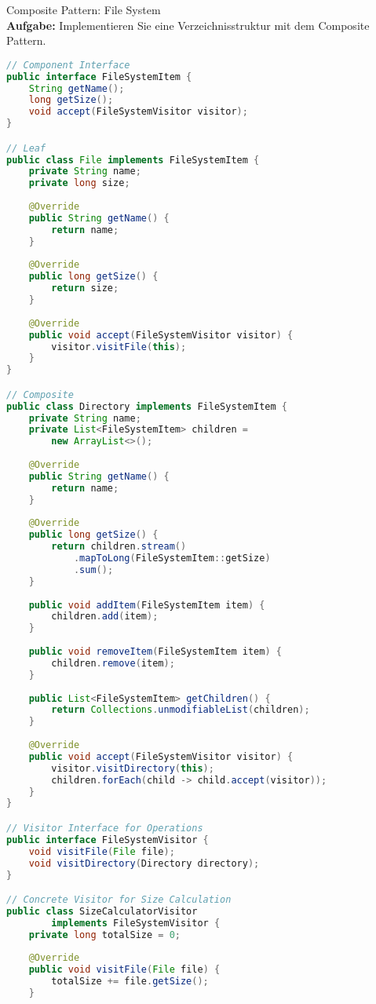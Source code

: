 \begin{example2}{Composite Pattern: File System}\\
\textbf{Aufgabe:} Implementieren Sie eine Verzeichnisstruktur mit dem Composite Pattern.

\begin{lstlisting}[language=Java, style=basesmol]
// Component Interface
public interface FileSystemItem {
    String getName();
    long getSize();
    void accept(FileSystemVisitor visitor);
}

// Leaf
public class File implements FileSystemItem {
    private String name;
    private long size;
    
    @Override
    public String getName() {
        return name;
    }
    
    @Override
    public long getSize() {
        return size;
    }
    
    @Override
    public void accept(FileSystemVisitor visitor) {
        visitor.visitFile(this);
    }
}

// Composite
public class Directory implements FileSystemItem {
    private String name;
    private List<FileSystemItem> children = 
        new ArrayList<>();
        
    @Override
    public String getName() {
        return name;
    }
    
    @Override
    public long getSize() {
        return children.stream()
            .mapToLong(FileSystemItem::getSize)
            .sum();
    }
    
    public void addItem(FileSystemItem item) {
        children.add(item);
    }
    
    public void removeItem(FileSystemItem item) {
        children.remove(item);
    }
    
    public List<FileSystemItem> getChildren() {
        return Collections.unmodifiableList(children);
    }
    
    @Override
    public void accept(FileSystemVisitor visitor) {
        visitor.visitDirectory(this);
        children.forEach(child -> child.accept(visitor));
    }
}

// Visitor Interface for Operations
public interface FileSystemVisitor {
    void visitFile(File file);
    void visitDirectory(Directory directory);
}

// Concrete Visitor for Size Calculation
public class SizeCalculatorVisitor 
        implements FileSystemVisitor {
    private long totalSize = 0;
    
    @Override
    public void visitFile(File file) {
        totalSize += file.getSize();
    }
    

\end{lstlisting}
\end{example2}

